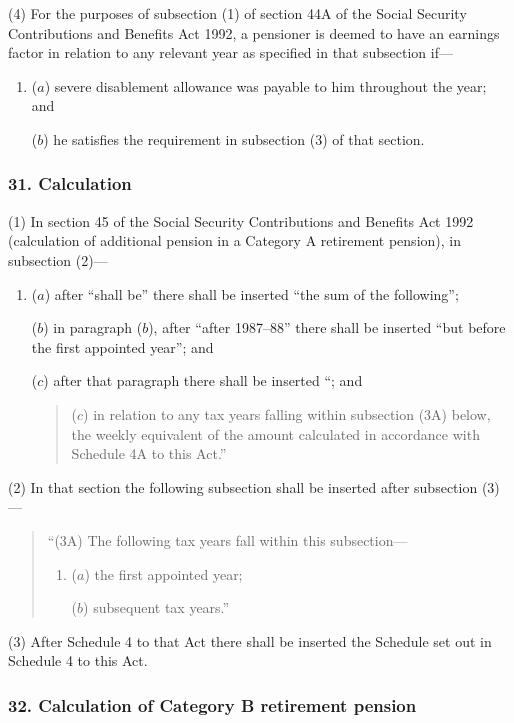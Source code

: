 \documentclass[12pt,a4paper]{article}
\begin{document}
(4) For the purposes of subsection (1)  of section 44A of the Social Security Contributions and Benefits Act 1992, a pensioner is deemed to have an earnings factor in relation to any relevant year as specified in that subsection if—
\begin{enumerate}\item[]
($a$) severe disablement allowance was payable to him throughout the year; and

($b$) he satisfies the requirement in subsection (3)  of that section.
\end{enumerate}

\subsubsection{31. Calculation}

(1) In section 45 of the Social Security Contributions and Benefits Act 1992 (calculation of additional pension in a Category A retirement pension), in subsection (2)—
\begin{enumerate}\item[]
($a$) after “shall be” there shall be inserted “the sum of the following”;

($b$) in paragraph ($b$), after “after 1987--88” there shall be inserted “but before the first appointed year”; and

($c$) after that paragraph there shall be inserted “; and
\begin{quotation}
($c$) in relation to any tax years falling within subsection (3A)  below, the weekly equivalent of the amount calculated in accordance with Schedule 4A to this Act.”
\end{quotation}
\end{enumerate}

(2) In that section the following subsection shall be inserted after subsection (3)—
\begin{quotation}
“(3A) The following tax years fall within this subsection—
\begin{enumerate}\item[]
($a$) the first appointed year;

($b$) subsequent tax years.”
\end{enumerate}
\end{quotation}

(3) After Schedule 4 to that Act there shall be inserted the Schedule set out in Schedule 4 to this Act.

\subsubsection{32. Calculation of Category B retirement pension}
\end{document}
